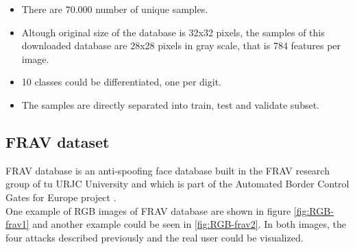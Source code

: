 \begin{itemize}
 \item There are 70.000 number of unique samples.
 \item Altough original size of the database is 32x32 pixels, the samples of this downloaded database are 28x28 pixels in gray scale, that is 784 features per image.
 \item 10 classes could be differentiated, one per digit.
\item The samples are directly separated into train, test and validate subset.
\end{itemize}

\subsection{FRAV dataset}
FRAV database is an anti-spoofing face database built in the FRAV research group of tu URJC University and which is part of the Automated Border Control Gates for Europe project \cite{ABC4EU}.\\

One example of RGB images of FRAV database are shown in figure \ref{fig:RGB-frav1} and another example could be seen in \ref{fig:RGB-frav2}. In both images, the four attacks described previously and the real user could be visualized. \\


